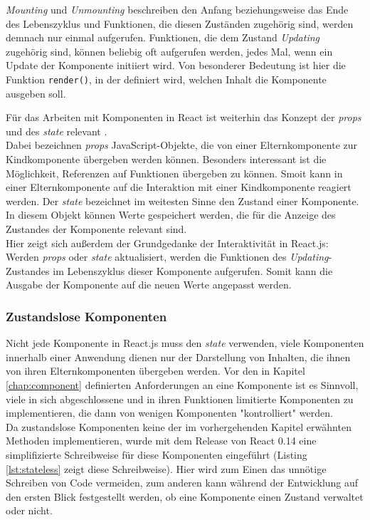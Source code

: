 \textit{Mounting} und \textit{Unmounting} beschreiben den Anfang beziehungsweise das Ende des Lebenszyklus und Funktionen, die diesen Zuständen zugehörig sind, werden demnach nur einmal aufgerufen.
Funktionen, die  dem Zustand \textit{Updating} zugehörig sind, können beliebig oft aufgerufen werden, jedes Mal, wenn ein Update der Komponente initiiert wird. Von besonderer Bedeutung ist hier die Funktion \verb|render()|, in der definiert wird, welchen Inhalt die Komponente ausgeben soll.

Für das Arbeiten mit Komponenten in React ist weiterhin das Konzept der \textit{props} und des \textit{state} relevant \cite{ReactProps}.\\
Dabei bezeichnen \textit{props} JavaScript-Objekte, die von einer Elternkomponente zur Kindkomponente übergeben werden können. Besonders interessant ist die Möglichkeit, Referenzen auf Funktionen übergeben zu können. Smoit kann in einer Elternkomponente auf die Interaktion mit einer Kindkomponente reagiert werden.
Der \textit{state} bezeichnet im weitesten Sinne den Zustand einer Komponente. In diesem Objekt können Werte gespeichert werden, die für die Anzeige des Zustandes der Komponente relevant sind.\\
Hier zeigt sich außerdem der Grundgedanke der Interaktivität in React.js: Werden \textit{props} oder \textit{state} aktualisiert, werden die Funktionen des \textit{Updating}-Zustandes im Lebenszyklus dieser Komponente aufgerufen. Somit kann die Ausgabe der Komponente auf die neuen Werte angepasst werden.

\subsubsection{Zustandslose Komponenten}
\label{chap:stateless}
Nicht jede Komponente in React.js muss den \textit{state} verwenden, viele Komponenten innerhalb einer Anwendung dienen nur der Darstellung von Inhalten, die ihnen von ihren Elternkomponenten übergeben werden. Vor den in Kapitel \ref{chap:component} definierten Anforderungen an eine Komponente ist es Sinnvoll, viele in sich abgeschlossene und in ihren Funktionen limitierte Komponenten zu implementieren, die dann von wenigen Komponenten "kontrolliert" werden.\\
Da zustandslose Komponenten keine der im vorhergehenden Kapitel erwähnten Methoden implementieren, wurde mit dem Release von React 0.14\footnotemark{} eine simplifizierte Schreibweise für diese Komponenten eingeführt (Listing \ref{lst:stateless} zeigt diese Schreibweise). Hier wird zum Einen das unnötige Schreiben von Code vermeiden, zum anderen kann während der Entwicklung auf den ersten Blick festgestellt werden, ob eine Komponente einen Zustand verwaltet oder nicht.

